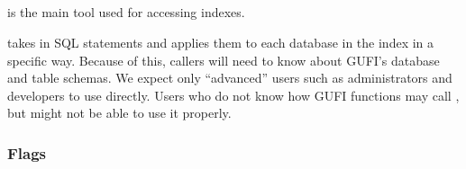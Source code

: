 \subsection{\gufiquery}

\gufiquery is the main tool used for accessing indexes.

\gufiquery takes in SQL statements and applies them to each database
in the index in a specific way. Because of this, callers will need to
know about GUFI's database and table schemas. We expect only
``advanced'' users such as administrators and developers to use
\gufiquery directly. Users who do not know how GUFI functions may call
\gufiquery, but might not be able to use it properly.

\subsubsection{Flags}

